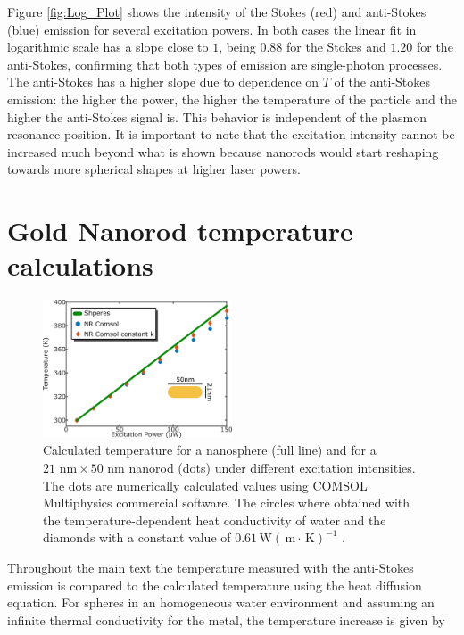 \documentclass[journal=nalefd,manuscript=letter]{achemso}
\newcommand{\K}{\ensuremath{\,\textrm{K}}}
\newcommand{\nm}{\ensuremath{\,\textrm{nm}}}
\newcommand{\m}{\ensuremath{\,\textrm{m}}}
\newcommand{\W}{\ensuremath{\,\textrm{W}}}
\begin{document}
Figure \ref{fig:Log_Plot} shows the intensity of the Stokes (red) and
anti-Stokes (blue) emission for several excitation powers. In both cases the
linear fit in logarithmic scale has a slope close to $1$, being $0.88$ for the
Stokes and $1.20$ for the anti-Stokes, confirming that both types of emission
are single-photon processes. The anti-Stokes has a higher slope due to dependence on $T$ of the 
anti-Stokes emission: the higher the power, the higher the temperature of the particle and the 
higher the anti-Stokes signal is. This behavior is independent of the plasmon
resonance position. It is important to note that the excitation intensity cannot
be increased much beyond what is shown because nanorods would start reshaping
towards more spherical shapes at higher laser powers.



\section{Gold Nanorod temperature calculations} \label{sec:temp-calc}

\begin{figure}[htp] \centering
\includegraphics[width=0.5\textwidth]{Figures/Supplementary/04_Compare_Comsol/04_Compare_Comsol.png}
\caption{Calculated temperature for a nanosphere (full line) and 
for a $21\,\nm\times 50\,\nm$ nanorod (dots) under different excitation intensities. 
The dots are numerically calculated values using COMSOL Multiphysics commercial software. 
The circles where obtained with the temperature-dependent heat conductivity of water 
and the diamonds with a constant value of $0.61 \W(\m\cdot\K)^{-1}$ .}
	\label{fig:Compare-Comsol}
\end{figure}

Throughout the main text the temperature measured with the anti-Stokes emission
is compared to the calculated temperature using the heat diffusion
equation. For spheres in an homogeneous water environment and assuming an infinite
thermal conductivity for the metal, the temperature increase is given by
\end{document}
